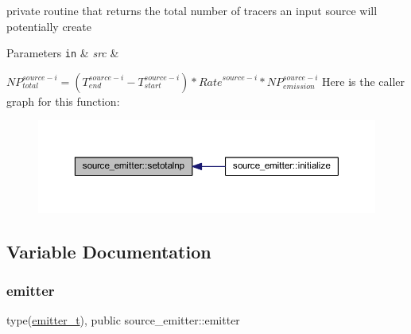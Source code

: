 private routine that returns the total number of tracers an input source will potentially create 
\begin{DoxyParams}[1]{Parameters}
\mbox{\tt in}  & {\em src} & \\
\hline
\end{DoxyParams}
${NP}_{total}^{source-i}=(T_{end}^{source-i}-T_{start}^{source-i})*{Rate}^{source-i}*{NP}_{emission}^{source-i}$ Here is the caller graph for this function\+:\nopagebreak
\begin{figure}[H]
\begin{center}
\leavevmode
\includegraphics[width=350pt]{namespacesource__emitter_a73d054a39fc1fccfde74173a5c7f2c58_icgraph}
\end{center}
\end{figure}


\subsection{Variable Documentation}
\mbox{\label{namespacesource__emitter_a357876a84a74e23c44e92ab8ef7dc35e}} 
\subsubsection{\texorpdfstring{emitter}{emitter}}
{\footnotesize\ttfamily type(\hyperlink{structsource__emitter_1_1emitter__t}{emitter\+\_\+t}), public source\+\_\+emitter\+::emitter}

